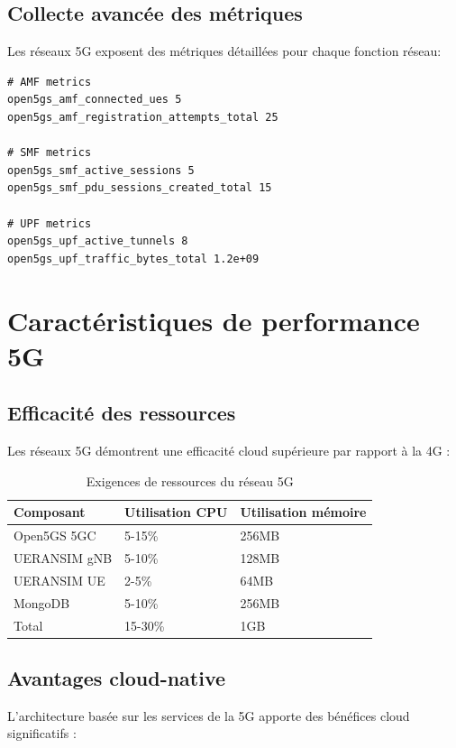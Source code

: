 \documentclass[12pt,a4paper]{report}
\begin{document}
\subsection{Collecte avancée des métriques}

Les réseaux 5G exposent des métriques détaillées pour chaque fonction réseau:

\begin{lstlisting}[caption=Exemples de métriques 5G]
# AMF metrics
open5gs_amf_connected_ues 5
open5gs_amf_registration_attempts_total 25

# SMF metrics  
open5gs_smf_active_sessions 5
open5gs_smf_pdu_sessions_created_total 15

# UPF metrics
open5gs_upf_active_tunnels 8
open5gs_upf_traffic_bytes_total 1.2e+09
\end{lstlisting}

\section{Caractéristiques de performance 5G}

\subsection{Efficacité des ressources}

Les réseaux 5G démontrent une efficacité cloud supérieure par rapport à la 4G :

\begin{table}[H]
\centering
\caption{Exigences de ressources du réseau 5G}
\label{tab:5g-resources}
\begin{tabular}{@{}lll@{}}
\toprule
Composant & Utilisation CPU & Utilisation mémoire \\
\midrule
Open5GS 5GC & 5-15\% & 256MB \\
UERANSIM gNB & 5-10\% & 128MB \\
UERANSIM UE & 2-5\% & 64MB \\
MongoDB & 5-10\% & 256MB \\
Total & 15-30\% & 1GB \\
\bottomrule
\end{tabular}
\end{table}

\subsection{Avantages cloud-native}

L'architecture basée sur les services de la 5G apporte des bénéfices cloud significatifs :
\end{document}
